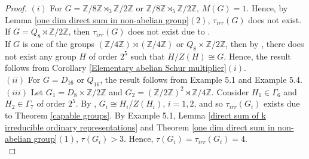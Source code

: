 \documentclass[a4paper,11pt]{amsart}
\numberwithin{equation}{section}
\numberwithin{equation}{subsection}
\newcommand{\Z}{\mathbb{Z}}
\newcommand{\poonam}[1]{{\color{blue} #1}}
\begin{document}
\begin{proof} 
$(i)$ For $G = \mathbb{Z}/8\mathbb{Z} \rtimes_{3} \mathbb{Z}/2\mathbb{Z}$ or $ \mathbb{Z}/8\mathbb{Z} \rtimes_{5} \mathbb{Z}/2\mathbb{Z}$, $M(G)= 1$. Hence, by Lemma \ref{one dim direct sum in non-abelian group}$(2)$, $\tau_{irr}(G)$ does not exist. If $G= Q_{8} \rtimes \mathbb{Z}/2\mathbb{Z}$, then $\tau_{irr}(G)$ does not exist due to \cite[Corollary 7.15]{NG}. \\ %
If $G$ is one of the groups $(\mathbb{Z}/4\mathbb{Z}) \rtimes (\mathbb{Z}/4\mathbb{Z})$ or $Q_{8} \times \mathbb{Z}/2\mathbb{Z}$, then by \cite{hall2n}, there does not exist any group $H$ of order $2^5$ such that $H/Z(H) \cong G$. Hence, the result follows from Corollary \ref{Elementary abelian Schur multiplier}$(i)$. \\

$(ii)$ For $G = D_{16}$ or $Q_{16}$, the result follows from Example 5.1 and Example 5.4. \\ 

$(iii)$ Let $G_1 = D_{8} \times \mathbb{Z}/2\mathbb{Z}$ and $G_2 = (\mathbb{Z}/2\mathbb{Z})^{2} \rtimes \mathbb{Z}/4\mathbb{Z}$. Consider $H_1 \in \Gamma_6$ and $H_2 \in \Gamma_7$ of order $2^5$. By \cite{hall2n}, $G_i \cong H_i/Z(H_i)$, $i=1,2$, and so $\tau_{irr}(G_i)$ exists due to Theorem \ref{capable groups}. By Example 5.1, Lemma \ref{direct sum of k irreducible ordinary representations} and Theorem \ref{one dim direct sum in non-abelian group}$(1)$, $\tau(G_i) > 3$. Hence, $\tau(G_i)= \tau_{irr}(G_i)= 4$. \\   %



\end{proof}
\end{document}
